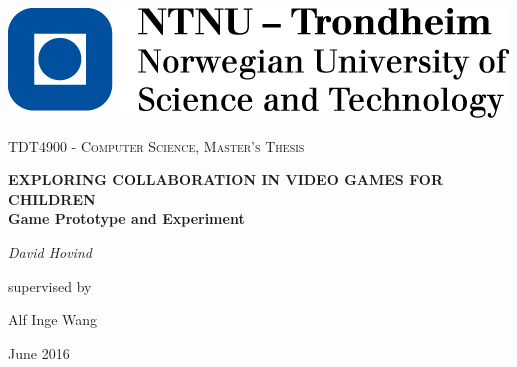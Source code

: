 \begin{titlepage}
	\includegraphics[]{images/ntnu_logo}\par\vspace{1.5cm}
	\centering
	{\scshape\Large TDT4900 - Computer Science, Master's Thesis\par}
	\vspace{1.5cm}
	{\LARGE\bfseries \uppercase{Exploring collaboration in video games for children} \\ 
	\Large Game Prototype and Experiment\par}
	\vspace{2cm}
	{\Large\itshape David Hovind\par}
	\vfill
	supervised by\par
	Alf Inge Wang
	
	\vfill
	
	{\large June 2016}
\end{titlepage}
